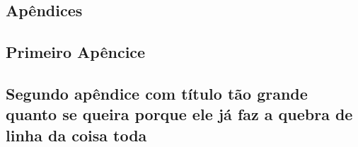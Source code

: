
\begin{apendicesenv}
  \renewcommand{\partapendices}{
  \part*{Apêndices}}
  \partapendices

  \chapter{Primeiro Apêncice}

  \lipsum[50] %

  \chapter{Segundo apêndice com título tão grande quanto se queira porque ele
  já faz a quebra de linha da coisa toda}
  \lipsum[51-53] %
\end{apendicesenv}
